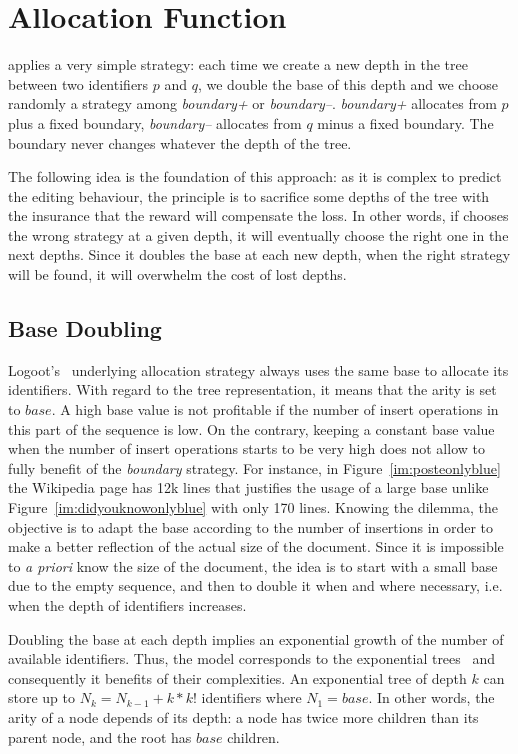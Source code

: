 \section{\NAME{} Allocation Function}
\label{sec:proposal}

\NAME{} applies a very simple strategy: each time we create a new depth in the
tree between two identifiers $p$ and $q$, we double the base of this depth and
we choose randomly a strategy among \emph{boundary+} or
\emph{boundary--}. \emph{boundary+} allocates from $p$ plus a fixed boundary,
\emph{boundary--} allocates from $q$ minus a fixed boundary. The boundary never
changes whatever the depth of the tree.

The following idea is the foundation of this approach: as it is complex to
predict the editing behaviour, the principle is to sacrifice some depths of the
tree with the insurance that the reward will compensate the loss.  In other
words, if \NAME{} chooses the wrong strategy at a given depth, it will
eventually choose the right one in the next depths. Since it doubles the base
at each new depth, when the right strategy will be found, it will overwhelm the
cost of lost depths.

\subsection{Base Doubling}
Logoot's~\cite{weiss2009logoot} underlying allocation strategy always uses the
same base to allocate its identifiers. With regard to the tree representation,
it means that the arity is set to $base$. A high base value is not profitable
if the number of insert operations in this part of the sequence is low. On the
contrary, keeping a constant base value when the number of insert operations
starts to be very high does not allow to fully benefit of the \emph{boundary}
strategy. For instance, in Figure~\ref{im:posteonlyblue} the Wikipedia page has
12k lines that justifies the usage of a large base unlike
Figure~\ref{im:didyouknowonlyblue} with only 170 lines. Knowing the dilemma,
the objective is to adapt the base according to the number of insertions in
order to make a better reflection of the actual size of the document.  Since it
is impossible to \emph{a priori} know the size of the document, the idea is to
start with a small base due to the empty sequence, and then to double it when
and where necessary, i.e. when the depth of identifiers increases.

%

Doubling the base at each depth implies an exponential growth of the number of
available identifiers. Thus, the model corresponds to the exponential
trees~\cite{andersson2007dynamic,singh2011implementation,andersson1996faster}
and consequently it benefits of their complexities. An exponential tree of
depth $k$ can store up to $N_k=N_{k-1}+k*k!$ identifiers where $N_1=base$.  In
other words, the arity of a node depends of its depth: a node has twice more
children than its parent node, and the root has $base$ children.

